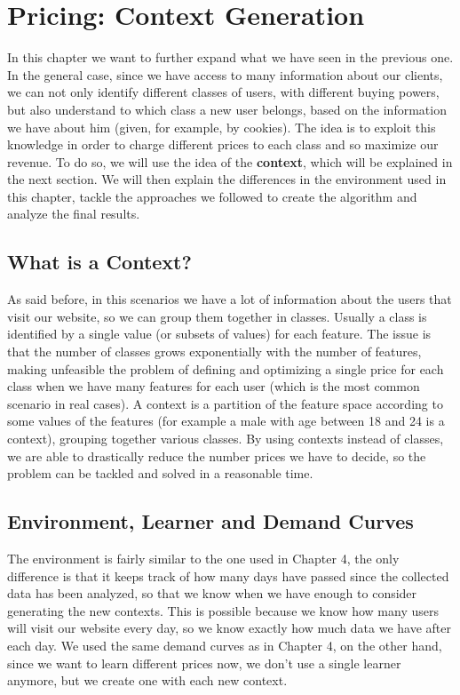 \chapter{Pricing: Context Generation}\label{ch:pricing:-context-generation}

In this chapter we want to further expand what we have seen in the previous one.
In the general case, since we have access to many information about our clients, we can not only identify different classes of users, with different buying powers, but also understand to which class a new user belongs, based on the information we have about him (given, for example, by cookies).
The idea is to exploit this knowledge in order to charge different prices to each class and so maximize our revenue.
To do so, we will use the idea of the \textbf{context}, which will be explained in the next section.
We will then explain the differences in the environment used in this chapter, tackle the approaches we followed to create the algorithm and analyze the final results.

\section{What is a Context?}\label{sec:what-is-a-context?}
As said before, in this scenarios we have a lot of information about the users that visit our website, so we can group them together in classes.
Usually a class is identified by a single value (or subsets of values) for each feature.
The issue is that the number of classes grows exponentially with the number of features, making unfeasible the problem of defining and optimizing a single price for each class when we have many features for each user (which is the most common scenario in real cases).
A context is a partition of the feature space according to some values of the features (for example a male with age between 18 and 24 is a context), grouping together various classes.
By using contexts instead of classes, we are able to drastically reduce the number prices we have to decide, so the problem can be tackled and solved in a reasonable time.

\section{Environment, Learner and Demand Curves}\label{sec:environment,-learner-and-demand-curves}
The environment is fairly similar to the one used in Chapter 4, the only difference is that it keeps track of how many days have passed since the collected data has been analyzed, so that we know when we have enough to consider generating the new contexts.
This is possible because we know how many users will visit our website every day, so we know exactly how much data we have after each day.
We used the same demand curves as in Chapter 4, on the other hand, since we want to learn different prices now, we don't use a single learner anymore, but we create one with each new context.

